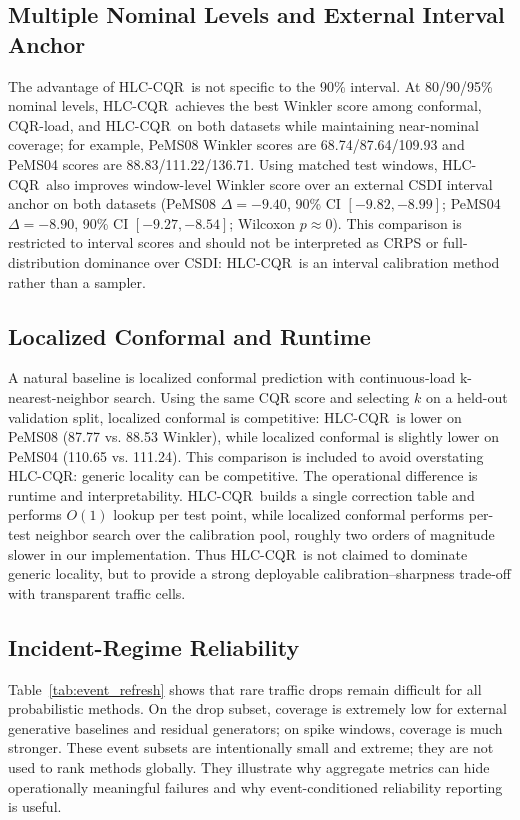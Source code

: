 \documentclass[letterpaper,journal]{IEEEtran}
\newcommand{\hlc}{HLC-CQR}
\begin{document}
\subsection{Multiple Nominal Levels and External Interval Anchor}
The advantage of \hlc\ is not specific to the 90\% interval. At 80/90/95\% nominal levels, \hlc\ achieves the best Winkler score among conformal, CQR-load, and \hlc\ on both datasets while maintaining near-nominal coverage; for example, PeMS08 Winkler scores are 68.74/87.64/109.93 and PeMS04 scores are 88.83/111.22/136.71. Using matched test windows, \hlc\ also improves window-level Winkler score over an external CSDI interval anchor on both datasets (PeMS08 $\Delta=-9.40$, 90\% CI $[-9.82,-8.99]$; PeMS04 $\Delta=-8.90$, 90\% CI $[-9.27,-8.54]$; Wilcoxon $p\approx 0$). This comparison is restricted to interval scores and should not be interpreted as CRPS or full-distribution dominance over CSDI: \hlc\ is an interval calibration method rather than a sampler.

\subsection{Localized Conformal and Runtime}
A natural baseline is localized conformal prediction with continuous-load k-nearest-neighbor search. Using the same CQR score and selecting $k$ on a held-out validation split, localized conformal is competitive: \hlc\ is lower on PeMS08 (87.77 vs. 88.53 Winkler), while localized conformal is slightly lower on PeMS04 (110.65 vs. 111.24). This comparison is included to avoid overstating \hlc: generic locality can be competitive. The operational difference is runtime and interpretability. \hlc\ builds a single correction table and performs $O(1)$ lookup per test point, while localized conformal performs per-test neighbor search over the calibration pool, roughly two orders of magnitude slower in our implementation. Thus \hlc\ is not claimed to dominate generic locality, but to provide a strong deployable calibration--sharpness trade-off with transparent traffic cells.

\subsection{Incident-Regime Reliability}
Table~\ref{tab:event_refresh} shows that rare traffic drops remain difficult for all probabilistic methods. On the drop subset, coverage is extremely low for external generative baselines and residual generators; on spike windows, coverage is much stronger. These event subsets are intentionally small and extreme; they are not used to rank methods globally. They illustrate why aggregate metrics can hide operationally meaningful failures and why event-conditioned reliability reporting is useful.
\end{document}
